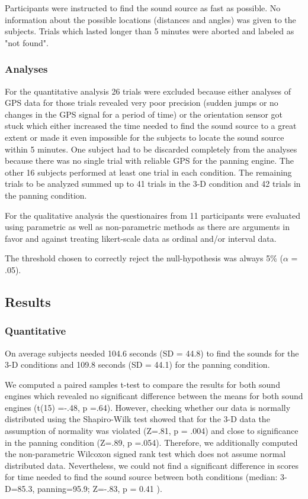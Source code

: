 \documentclass[journal]{IEEEtran}
\begin{document}
Participants were instructed to find the sound source as fast as possible. No information about the possible locations (distances and angles) was given to the subjects. Trials which lasted longer than 5 minutes were aborted and labeled as "not found". 

\subsubsection{Analyses}
For the quantitative analysis 26 trials were excluded because either analyses of GPS data for those trials revealed very poor precision (sudden jumps or no changes in the GPS signal for a period of time) or the orientation sensor got stuck which either increased the time needed to find the sound source to a great extent or made it even impossible for the subjects to locate the sound source within 5 minutes. One subject had to be discarded completely from the analyses because there was no single trial with reliable GPS for the panning engine. The other 16 subjects performed at least one trial in each condition. The remaining trials to be analyzed summed up to 41 trials in the 3-D condition and 42 trials in the panning condition.

For the qualitative analysis the questionaires from 11 participants were evaluated using parametric as well as non-parametric methods as there are arguments in favor \cite{Norman2010, Carifio2007} and against \cite{Kuzon1996} treating likert-scale data as ordinal and/or interval data. 

The threshold chosen to correctly reject the null-hypothesis was always 5\% ($\alpha$ = .05).

\subsection{Results}
\subsubsection{Quantitative}
On average subjects needed 104.6 seconds (SD = 44.8) to find the sounds for the 3-D conditions and 109.8 seconds (SD = 44.1) for the panning condition. 

We computed a paired samples t-test to compare the results for both sound engines which revealed no significant difference between the means for both sound engines (t(15) =-.48, p =.64). However, checking whether our data is normally distributed using the Shapiro-Wilk test showed that for the 3-D data the assumption of normality was violated (Z=.81, p = .004) and close to significance in the panning condition (Z=.89, p =.054). Therefore, we additionally computed the non-parametric Wilcoxon signed rank test which does not assume normal distributed data. Nevertheless, we could not find a significant difference in scores for time needed to find the sound source between both conditions (median: 3-D=85.3, panning=95.9; Z=-.83, p = 0.41 ). 
\end{document}
